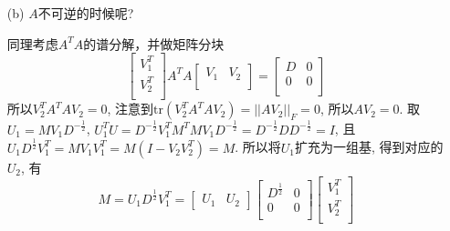 \begin{itemize}
\begin{itemize}
		\item[(b)] $A$不可逆的时候呢?
		\begin{solution}
		同理考虑$A^TA$的谱分解，并做矩阵分块
		\begin{equation}\nonumber
			\begin{bmatrix}
				V_1^T \\
				V_2^T \\
			\end{bmatrix}
			A^TA
			\begin{bmatrix}
				V_1& V_2 \\
			\end{bmatrix}
			=
			\begin{bmatrix}
				D& 0\\
				0& 0\\
			\end{bmatrix}
		\end{equation}
		所以$V_2^T A^TA V_2 = 0$, 注意到$\mathrm{tr}(V_2^TA^TAV_2) = ||AV_2||_F 
		= 0$, 所以$AV_2 = 0$.
		取$U_1 = MV_1D^{-\frac{1}{2}}$,
		$U_1^T U = D^{-\frac{1}{2}}V_1^TM^T M V_1 D^{-\frac{1}{2}} 
		= D^{-\frac{1}{2}} D D^{-\frac{1}{2}} = I$,
		且$U_1D^{\frac{1}{2}}V_1^T = MV_1V_1^T = M(I-V_2V_2^T) = M$.
		所以将$U_1$扩充为一组基, 得到对应的$U_2$, 有
		\begin{equation}\nonumber
			M = U_1D^{\frac{1}{2}}V_1^T = 
			\begin{bmatrix}
				U_1& U_2
			\end{bmatrix}
			\begin{bmatrix}
				D^{\frac{1}{2}} & 0\\
				              0 & 0\\
			\end{bmatrix}
			\begin{bmatrix}
				V_1^T\\
				V_2^T\\
			\end{bmatrix}
		\end{equation}
		\end{solution}
		\vspace{2cm}
	\end{itemize}
\end{itemize}